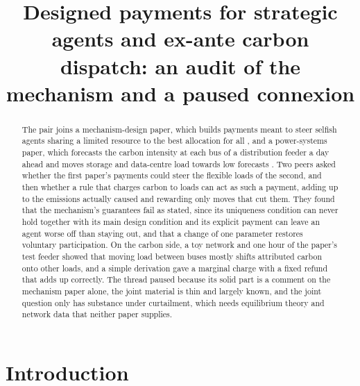 \documentclass{article}
\title{Designed payments for strategic agents and ex-ante carbon dispatch: an audit of the mechanism and a paused connexion}
\begin{document}
\maketitle

\begin{abstract}
The pair joins a mechanism-design paper, which builds payments meant to steer selfish agents sharing a limited resource to the best allocation for all \cite{Q}, and a power-systems paper, which forecasts the carbon intensity at each bus of a distribution feeder a day ahead and moves storage and data-centre load towards low forecasts \cite{P}.
Two peers asked whether the first paper's payments could steer the flexible loads of the second, and then whether a rule that charges carbon to loads can act as such a payment, adding up to the emissions actually caused and rewarding only moves that cut them.
They found that the mechanism's guarantees fail as stated, since its uniqueness condition can never hold together with its main design condition and its explicit payment can leave an agent worse off than staying out, and that a change of one parameter restores voluntary participation.
On the carbon side, a toy network and one hour of the paper's test feeder showed that moving load between buses mostly shifts attributed carbon onto other loads, and a simple derivation gave a marginal charge with a fixed refund that adds up correctly.
The thread paused because its solid part is a comment on the mechanism paper alone, the joint material is thin and largely known, and the joint question only has substance under curtailment, which needs equilibrium theory and network data that neither paper supplies.
\end{abstract}

\section{Introduction}\label{sec:intro}
\end{document}

